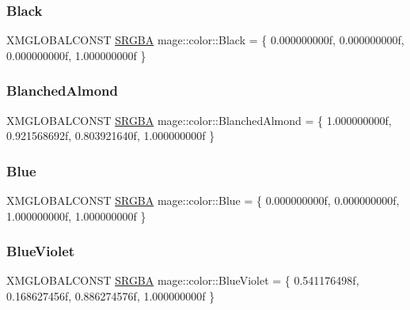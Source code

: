 \subsubsection{\texorpdfstring{Black}{Black}}
{\footnotesize\ttfamily X\+M\+G\+L\+O\+B\+A\+L\+C\+O\+N\+ST \hyperlink{structmage_1_1_s_r_g_b_a}{S\+R\+G\+BA} mage\+::color\+::\+Black = \{ 0.\+000000000f, 0.\+000000000f, 0.\+000000000f, 1.\+000000000f \}}

\hypertarget{namespacemage_1_1color_a2163d78d006491bb060f32315daf195d}{}\label{namespacemage_1_1color_a2163d78d006491bb060f32315daf195d} 
\subsubsection{\texorpdfstring{Blanched\+Almond}{BlanchedAlmond}}
{\footnotesize\ttfamily X\+M\+G\+L\+O\+B\+A\+L\+C\+O\+N\+ST \hyperlink{structmage_1_1_s_r_g_b_a}{S\+R\+G\+BA} mage\+::color\+::\+Blanched\+Almond = \{ 1.\+000000000f, 0.\+921568692f, 0.\+803921640f, 1.\+000000000f \}}

\hypertarget{namespacemage_1_1color_a699234cc5b5cf8bb6016f53e97f7b930}{}\label{namespacemage_1_1color_a699234cc5b5cf8bb6016f53e97f7b930} 
\subsubsection{\texorpdfstring{Blue}{Blue}}
{\footnotesize\ttfamily X\+M\+G\+L\+O\+B\+A\+L\+C\+O\+N\+ST \hyperlink{structmage_1_1_s_r_g_b_a}{S\+R\+G\+BA} mage\+::color\+::\+Blue = \{ 0.\+000000000f, 0.\+000000000f, 1.\+000000000f, 1.\+000000000f \}}

\hypertarget{namespacemage_1_1color_adade1710d2f06635049027dd4ea95fa3}{}\label{namespacemage_1_1color_adade1710d2f06635049027dd4ea95fa3} 
\subsubsection{\texorpdfstring{Blue\+Violet}{BlueViolet}}
{\footnotesize\ttfamily X\+M\+G\+L\+O\+B\+A\+L\+C\+O\+N\+ST \hyperlink{structmage_1_1_s_r_g_b_a}{S\+R\+G\+BA} mage\+::color\+::\+Blue\+Violet = \{ 0.\+541176498f, 0.\+168627456f, 0.\+886274576f, 1.\+000000000f \}}


